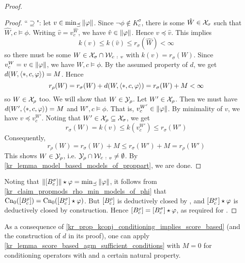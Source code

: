 \begin{proof}
\begin{proof}
            ``$\supseteq$": let $v \in \min_{\preceq}{\|{\varphi}\|}$. Since
            $\neg\phi \notin K^\sigma_c$, there is some $\hat{W} \in \mathcal{X}_\sigma$
            such that $\hat{W}, c \models \phi$. Writing $\hat{v} =
            v^{\hat{W}}_c$, we have $\hat{v} \in \|{\varphi}\|$. Hence $v
            \preceq \hat{v}$. This implies
            \[
                k(v) \le k(\hat{v}) \le r_\sigma(\hat{W}) < \infty
            \]
            so there must be some $W \in \mathcal{X}_\sigma \cap \mathcal{W}_{c\ :\  v}$ with
            $k(v) = r_\sigma(W)$. Since $v^W_c = v \in \|{\varphi}\|$, we
            have $W, c \models \phi$. By the assumed property of $d$, we get
            $d(W, \langle {\ast, c, \varphi} \rangle) = M$. Hence
            \[
                r_\rho(W)
                = r_\sigma(W) + d(W, \langle {\ast, c, \varphi} \rangle)
                = r_\sigma(W) + M
                < \infty
            \]
            so $W \in \mathcal{X}_\rho$ too. We will show that $W \in \mathcal{Y}_\rho$. Let $W'
            \in \mathcal{X}_\rho$. Then we must have $d(W', \langle {\ast, c, \varphi} \rangle) = M$
            and $W', c \models \phi$. That is, $v^{W'}_c \in \|{\varphi}\|$.
            By minimality of $v$, we have $v \preceq v^{W'}_c$. Noting that $W'
            \in \mathcal{X}_\rho \subseteq \mathcal{X}_\sigma$, we get
            \[
                r_\sigma(W)
                = k(v)
                \le k(v^{W'}_c)
                \le r_\sigma(W')
            \]
            Consequently,
            \[
                r_\rho(W)
                = r_\sigma(W) + M
                \le r_\sigma(W') + M
                = r_\rho(W')
            \]
            This shows $W \in \mathcal{Y}_\rho$, i.e. $\mathcal{Y}_\rho \cap \mathcal{W}_{c\ :\  v} \ne
            \emptyset$. By \cref{kr_lemma_model_based_models_of_proppart}, we are
            done.

        \end{proof}

    Noting that $\|{\left[{B^\sigma_c}\right]}\| \star \varphi =
    \min_{\preceq}{\|{\varphi}\|}$, it follows from
    \cref{kr_claim_propmods_rho_min_models_of_phi} that
    $\operatorname{Cn}_0(\left[{B^\rho_c}\right]) = \operatorname{Cn}_0(\left[{B^\sigma_c}\right] \star \varphi)$.
    But $\left[{B^\rho_c}\right]$ is deductively closed by \closure{}, and
    $\left[{B^\sigma_c}\right]
    \star \varphi$ is deductively closed by construction. Hence
    $\left[{B^\rho_c}\right] = \left[{B^\sigma_c}\right] \star \varphi$, as required for
    \agm{}.

\end{proof}

As a consequence of \cref{kr_prop_kconj_conditioning_implies_score_based} (and the
construction of $d$ in its proof), one can apply
\cref{kr_lemma_score_based_agm_sufficient_conditions} with $M = 0$ for
conditioning operators with \kconj{} and a certain natural property.


